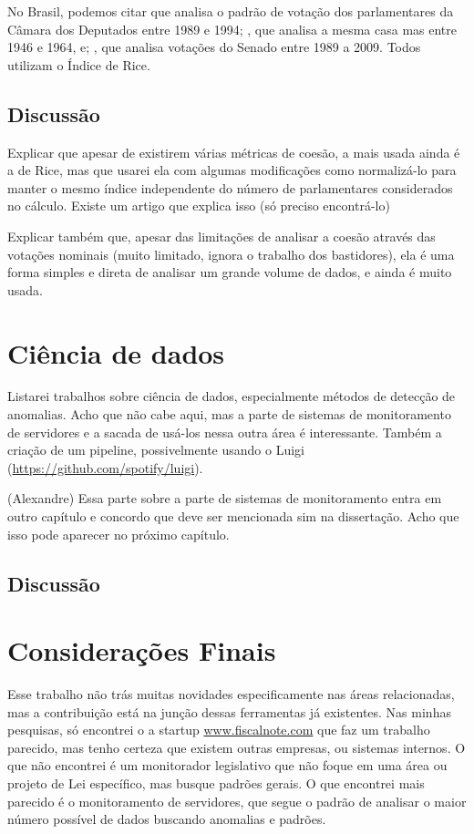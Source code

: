 No Brasil, podemos citar  que analisa o padrão de
votação dos parlamentares da Câmara dos Deputados entre 1989 e 1994;
, que analisa a mesma casa mas entre 1946 e 1964, e;
, que analisa votações do Senado entre 1989 a 2009. Todos utilizam o Índice de Rice.

\subsection{Discussão}

Explicar que apesar de existirem várias métricas de coesão, a mais usada ainda é a de Rice, mas que usarei ela com algumas modificações como normalizá-lo para manter o mesmo índice independente do número de parlamentares considerados no cálculo. Existe um artigo que explica isso (só preciso encontrá-lo)

Explicar também que, apesar das limitações de analisar a coesão através das votações nominais (muito limitado, ignora o trabalho dos bastidores), ela é uma forma simples e direta de analisar um grande volume de dados, e ainda é muito usada.

\section{Ciência de dados}

Listarei trabalhos sobre ciência de dados, especialmente métodos de detecção de anomalias. Acho que não cabe aqui, mas a parte de sistemas de monitoramento de servidores e a sacada de usá-los nessa outra área é interessante. Também a criação de um pipeline, possivelmente usando o Luigi (\url{https://github.com/spotify/luigi}).


(Alexandre) Essa parte sobre a parte de sistemas de monitoramento entra em outro capítulo e concordo que deve ser mencionada sim na dissertação. Acho que isso pode aparecer no próximo capítulo.


\subsection{Discussão}

\section{Considerações Finais}

Esse trabalho não trás muitas novidades especificamente nas áreas relacionadas, mas a contribuição está na junção dessas ferramentas já existentes. Nas minhas pesquisas, só encontrei o a startup \url{www.fiscalnote.com} que faz um trabalho parecido, mas tenho certeza que existem outras empresas, ou sistemas internos. O que não encontrei é um monitorador legislativo que não foque em uma área ou projeto de Lei específico, mas busque padrões gerais. O que encontrei mais parecido é o monitoramento de servidores, que segue o padrão de analisar o maior número possível de dados buscando anomalias e padrões.


